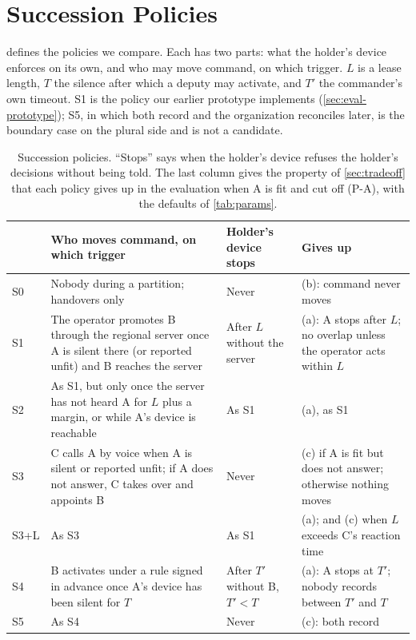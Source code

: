 \section{Succession Policies}
\label{sec:policies}

 defines the policies we compare. Each has two parts: what the holder's
device enforces on its own, and who may move command, on which trigger. $L$ is a lease
length, $T$ the silence after which a deputy may activate, and $T'$ the commander's own
timeout. S1 is the policy our earlier prototype implements (\cref{sec:eval-prototype}); S5,
in which both record and the organization reconciles later, is the boundary case on the
plural side and is not a candidate.

\begin{table}[t]
\caption{Succession policies. ``Stops'' says when the holder's device refuses the holder's
decisions without being told. The last column gives the property of \cref{sec:tradeoff}
that each policy gives up in the evaluation when A is fit and cut off (P-A), with the
defaults of \cref{tab:params}.}
\label{tab:policies}
\footnotesize
\setlength{\tabcolsep}{3pt}
\begin{tabularx}{\textwidth}{@{}>{\raggedright\arraybackslash}p{}>{\raggedright\arraybackslash}p{}>{\raggedright\arraybackslash}p{}>{\raggedright\arraybackslash}X@{}}
\toprule
& \textbf{Who moves command, on which trigger} & \textbf{Holder's device stops} & \textbf{Gives up} \\
\midrule
S0 & Nobody during a partition; handovers only & Never & (b): command never moves \\
\addlinespace
S1 & The operator promotes B through the regional server once A is silent there (or reported unfit) and B reaches the server & After $L$ without the server & (a): A stops after $L$; no overlap unless the operator acts within $L$ \\
\addlinespace
S2 & As S1, but only once the server has not heard A for $L$ plus a margin, or while A's device is reachable & As S1 & (a), as S1 \\
\addlinespace
S3 & C calls A by voice when A is silent or reported unfit; if A does not answer, C takes over and appoints B & Never & (c) if A is fit but does not answer; otherwise nothing moves \\
\addlinespace
S3+L & As S3 & As S1 & (a); and (c) when $L$ exceeds C's reaction time \\
\addlinespace
S4 & B activates under a rule signed in advance once A's device has been silent for $T$ & After $T'$ without B, $T' < T$ & (a): A stops at $T'$; nobody records between $T'$ and $T$ \\
\addlinespace
S5 & As S4 & Never & (c): both record \\
\bottomrule
\end{tabularx}
\end{table}

